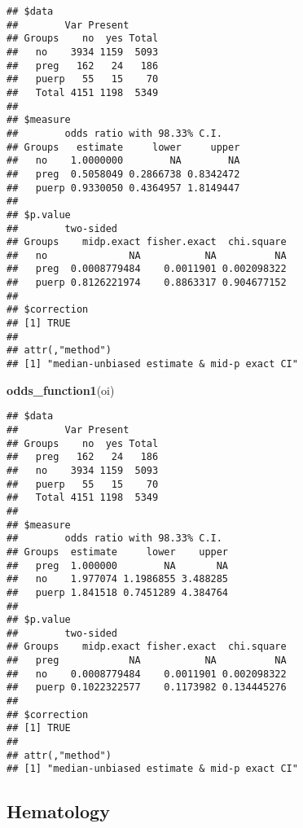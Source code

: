 \documentclass[
]{article}
\newenvironment{Shaded}{\begin{snugshade}}{\end{snugshade}}
\newcommand{\KeywordTok}[1]{\textcolor[rgb]{0.13,0.29,0.53}{\textbf{#1}}}
\newcommand{\NormalTok}[1]{#1}
\newcommand{\OperatorTok}[1]{\textcolor[rgb]{0.81,0.36,0.00}{\textbf{#1}}}
\newcommand{\StringTok}[1]{\textcolor[rgb]{0.31,0.60,0.02}{#1}}
\begin{document}
\begin{verbatim}
## $data
##        Var Present
## Groups    no  yes Total
##   no    3934 1159  5093
##   preg   162   24   186
##   puerp   55   15    70
##   Total 4151 1198  5349
## 
## $measure
##        odds ratio with 98.33% C.I.
## Groups   estimate     lower     upper
##   no    1.0000000        NA        NA
##   preg  0.5058049 0.2866738 0.8342472
##   puerp 0.9330050 0.4364957 1.8149447
## 
## $p.value
##        two-sided
## Groups    midp.exact fisher.exact  chi.square
##   no              NA           NA          NA
##   preg  0.0008779484    0.0011901 0.002098322
##   puerp 0.8126221974    0.8863317 0.904677152
## 
## $correction
## [1] TRUE
## 
## attr(,"method")
## [1] "median-unbiased estimate & mid-p exact CI"
\end{verbatim}

\begin{Shaded}
\begin{Highlighting}[]
\KeywordTok{odds_function1}\NormalTok{(oi)}
\end{Highlighting}
\end{Shaded}

\begin{verbatim}
## $data
##        Var Present
## Groups    no  yes Total
##   preg   162   24   186
##   no    3934 1159  5093
##   puerp   55   15    70
##   Total 4151 1198  5349
## 
## $measure
##        odds ratio with 98.33% C.I.
## Groups  estimate     lower    upper
##   preg  1.000000        NA       NA
##   no    1.977074 1.1986855 3.488285
##   puerp 1.841518 0.7451289 4.384764
## 
## $p.value
##        two-sided
## Groups    midp.exact fisher.exact  chi.square
##   preg            NA           NA          NA
##   no    0.0008779484    0.0011901 0.002098322
##   puerp 0.1022322577    0.1173982 0.134445276
## 
## $correction
## [1] TRUE
## 
## attr(,"method")
## [1] "median-unbiased estimate & mid-p exact CI"
\end{verbatim}

\hypertarget{hematology}{%
\subsection{Hematology}\label{hematology}}

\begin{Shaded}
\end{Shaded}
\end{document}
